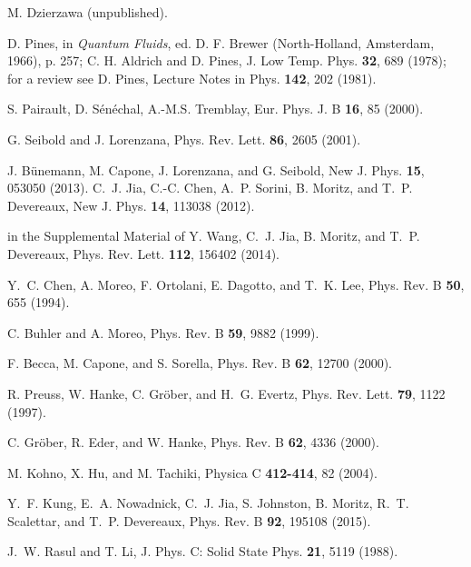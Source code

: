 \documentclass[showpacs,amsmath,twocolumn,floatfix]{revtex4-1}
\begin{document}
\begin{thebibliography}{0}
 M. Dzierzawa (unpublished).                    

 D. Pines,
                    in \textit{Quantum Fluids}, ed. D. F. Brewer
                    (North-Holland, Amsterdam, 1966), p. 257;
                C. H. Aldrich and D. Pines,
                    J. Low Temp. Phys. \textbf{32}, 689 (1978);
                for a review see D. Pines,
                    Lecture Notes in Phys. \textbf{142}, 202 (1981).  
                    
 S. Pairault, D. S\'en\'echal, A.-M.S. Tremblay,
                    Eur. Phys. J. B \textbf{16}, 85 (2000).   

 G. Seibold and J. Lorenzana, 
                    Phys. Rev. Lett. \textbf{86}, 2605 (2001).
                    
 J. B\"unemann, M. Capone, J. Lorenzana, and G. Seibold,
                     New J. Phys. \textbf{15}, 053050 (2013).                    
 C.~J. Jia, C.-C. Chen, A.~P. Sorini, B. Moritz, and T.~P. Devereaux,
                     New J. Phys. \textbf{14}, 113038 (2012).
                  
 in the Supplemental Material of
                Y. Wang, C.~J. Jia, B. Moritz, and T.~P. Devereaux,
                     Phys. Rev. Lett. \textbf{112}, 156402 (2014).


 Y.~C. Chen, A. Moreo, F. Ortolani, E. Dagotto, and T.~K. Lee,
                     Phys. Rev. B \textbf{50}, 655 (1994). 

 C. Buhler and A. Moreo,
                     Phys. Rev. B \textbf{59}, 9882 (1999).
                     
 F. Becca, M. Capone, and S. Sorella,
                     Phys. Rev. B \textbf{62}, 12700 (2000).


 R. Preuss, W. Hanke, C. Gr\"ober, and H.~G. Evertz,
                     Phys. Rev. Lett. \textbf{79}, 1122 (1997).
                     
 C. Gr\"ober, R. Eder, and W. Hanke,
                     Phys. Rev. B \textbf{62}, 4336 (2000).
                     
 M. Kohno, X. Hu, and M. Tachiki,
                     Physica C \textbf{412-414}, 82 (2004).
                

 Y.~F. Kung, E.~A. Nowadnick, C.~J. Jia, S. Johnston, B. Moritz,
                R.~T. Scalettar, and T.~P. Devereaux,
                     Phys. Rev. B \textbf{92}, 195108 (2015).   
           

 J.~W. Rasul and T. Li,
                    J. Phys. C: Solid State Phys. \textbf{21}, 5119 (1988).
                    
           
\end{thebibliography}
\end{document}
